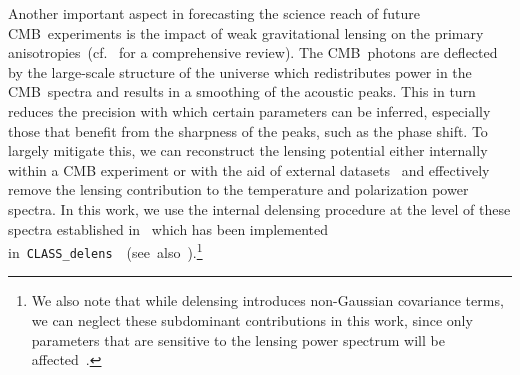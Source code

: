 \documentclass[11pt]{article}
\numberwithin{equation}{section}
\begin{document}
Another important aspect in forecasting the science reach of future CMB~experiments is the impact of weak gravitational lensing on the primary anisotropies~(cf.~\cite{Lewis:2006fu} for a comprehensive review). The CMB~photons are deflected by the large-scale structure of the universe which redistributes power in the CMB~spectra and results in a smoothing of the acoustic peaks. This in turn reduces the precision with which certain parameters can be inferred, especially those that benefit from the sharpness of the peaks, such as the phase shift. To largely mitigate this, we can reconstruct the lensing potential either internally within a CMB experiment or with the aid of external datasets~\cite{Okamoto:2003zw, Smith:2010gu, Larsen:2016wpa, Green:2016cjr, Sehgal:2016eag, Carron:2017vfg, ACT:2020goa, Millea:2020iuw, Hotinli:2021umk, SPT-3G:2024atg} and effectively remove the lensing contribution to the temperature and polarization power spectra. In this work, we use the internal delensing procedure at the level of these spectra established in~\cite{Green:2016cjr} which has been implemented \mbox{in \texttt{CLASS\_delens}~\cite{Hotinli:2021umk}~(see also~\cite{Trendafilova:2023xtq})}.\footnote{We also note that while delensing introduces non-Gaussian covariance terms, we can neglect these subdominant contributions in this work, since only parameters that are sensitive to the lensing power spectrum will be affected~\cite{Green:2016cjr}.}\medskip
\end{document}
